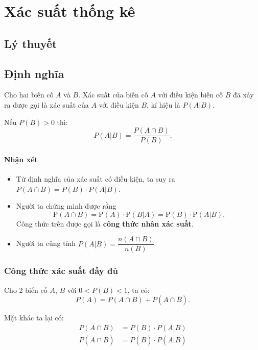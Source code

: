 \documentclass[twoside,final]{hcmut-report}
\begin{document}
\coverpage\clearpage
\tableofcontents
\clearpage

\fancyfoot{}

\setcounter{page}{1}
\section{Xác suất thống kê}
\subsection{Lý thuyết}
\subsection{Định nghĩa}
Cho hai biến cố $A$ và $B$. Xác suất của biến cố $A$ với điều kiện biến cố $B$ đã xảy ra được gọi là xác suất của $A$ với điều kiện $B$, kí hiệu là $P(A | B)$.

Nếu $P(B) > 0$ thì:
\[
    P(A | B) = \frac{P(A \cap B)}{P(B)}.
\]
\paragraph*{Nhận xét}
\begin{itemize}[itemsep=0pt, topsep=0pt, parsep=0pt,label=-]
    \item Từ định nghĩa của xác suất có điều kiện, ta suy ra $P(A \cap B) = P(B) \cdot P(A | B)$.
    \item Người ta chứng minh được rằng
          \[
              \mathrm{P}(A \cap B) = \mathrm{P}(A) \cdot \mathrm{P}(B | A) = \mathrm{P}(B) \cdot \mathrm{P}(A | B).
          \]
          Công thức trên được gọi là \textbf{công thức nhân xác suất}.
    \item Người ta cũng tính $P(A | B) = \dfrac{n(A \cap B)}{n(B)}$.
\end{itemize}
\subsubsection{Công thức xác suất đầy đủ}
Cho 2 biến cố $A$, $B$ với $0 < P(B) < 1$, ta có:
\[
    P(A) = P(A \cap B) + P(A \cap \overline{B}).
\]

Mặt khác ta lại có:
\begin{align*}
    P(A \cap B)            & = P(B) \cdot P(A | B)                       \\
    P(A \cap \overline{B}) & = P(\overline{B}) \cdot P(A | \overline{B})
\end{align*}
\end{document}
